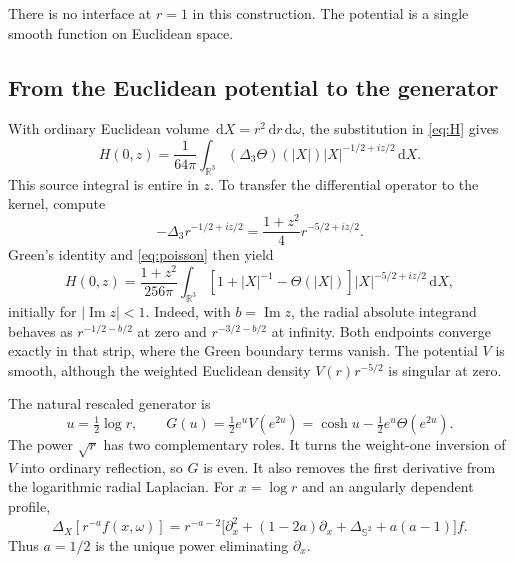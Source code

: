 \documentclass[11pt]{article}
\theoremstyle{remark}
\numberwithin{equation}{section}
\newcommand{\R}{\mathbb R}
\newcommand{\Sph}{\mathbb S^2}
\newcommand{\dd}{\,\mathrm d}
\begin{document}
There is no interface at \(r=1\) in this construction. The potential
is a single smooth function on Euclidean space.

\subsection{From the Euclidean potential to the generator}

With ordinary Euclidean volume \(\dd X=r^2\dd r\dd\omega\),
the substitution in \eqref{eq:H} gives
\begin{equation}\label{eq:euclidean-source}
 H(0,z)=\frac1{64\pi}\int_{\R^3}
 (\Delta_3\Theta)(|X|)|X|^{-1/2+iz/2}\dd X.
\end{equation}
This source integral is entire in \(z\). To transfer the differential
operator to the kernel, compute
\begin{equation}\label{eq:powerkernel}
 -\Delta_3r^{-1/2+iz/2}
 =\frac{1+z^2}{4}r^{-5/2+iz/2}.
\end{equation}
Green's identity and \eqref{eq:poisson} then yield
\begin{equation}\label{eq:euclidean-potential}
 \boxed{\displaystyle
 H(0,z)=\frac{1+z^2}{256\pi}\int_{\R^3}
 [1+|X|^{-1}-\Theta(|X|)]|X|^{-5/2+iz/2}\dd X,}
\end{equation}
initially for \(|\operatorname{Im}z|<1\). Indeed, with
\(b=\operatorname{Im}z\), the radial absolute integrand behaves as
\(r^{-1/2-b/2}\) at zero and \(r^{-3/2-b/2}\) at infinity.
Both endpoints converge exactly in that strip, where the Green boundary
terms vanish. The potential \(V\) is smooth, although the weighted
Euclidean density \(V(r)r^{-5/2}\) is singular at zero.

The natural rescaled generator is
\begin{equation}\label{eq:G}
 \boxed{\displaystyle
 u=\tfrac12\log r,\qquad
 G(u)=\tfrac12e^uV(e^{2u})
     =\cosh u-\tfrac12e^u\Theta(e^{2u}).}
\end{equation}
The power \(\sqrt r\) has two complementary roles. It turns the
weight-one inversion of \(V\) into ordinary reflection, so \(G\)
is even. It also removes the first derivative from the logarithmic
radial Laplacian. For \(x=\log r\) and an angularly dependent profile,
\begin{equation}\label{eq:conjugation}
 \Delta_X[r^{-a}f(x,\omega)]
 =r^{-a-2}\bigl[\partial_x^2+(1-2a)\partial_x
    +\Delta_{\Sph}+a(a-1)\bigr]f.
\end{equation}
Thus \(a=1/2\) is the unique power eliminating \(\partial_x\).
\end{document}
